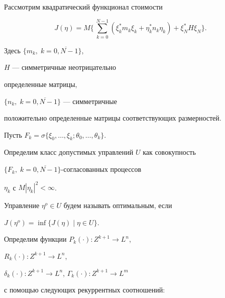 Рассмотрим квадратический функционал стоимости


\begin{equation}


J(\eta)=M\biggl\{\,\sum_{k=0}^{N-1}(\xi_{k}^{*}m_{k}\xi_{k}


+\eta_{k}^{*}n_{k}\eta_{k})+\xi_{N}^{*}H\xi_{N}\biggr\}.


\end{equation}


Здесь $\bigl\{m_{k},\; k=\overline{0,N-1}\bigr\}$, 


$H$ --- симметричные неотрицательно


определенные матрицы,


$\bigl\{n_{k},\; k=\overline{0,N-1}\bigr\}$ --- симметричные


положительно определенные матрицы соответствующих размерностей.





Пусть $F_{k}=\sigma\bigl\{\xi_{0},\dotsc,\xi_{k};\theta_{0},


\dotsc,\theta_{k}\bigr\}$.


Определим класс допустимых управлений $U$ как совокупность


$\bigl\{F_{k},\; k=\overline{0,N-1}\bigr\}$-согласованных процессов


$\eta_{k}$ с $M{|\eta_{k}|}^{2}<\infty$.





Управление $\eta^{o}\in U$ будем называть оптимальным, если


$J(\eta^{o})=\inf\bigl\{J(\eta)\mid\eta\in U\bigl\}$.





Определим функции $P_{k}(\cdot):Z^{k+1}\to L^{n}$,


$R_{k}(\cdot):Z^{k+1}\to L^{n}$,


$\delta_{k}(\cdot):Z^{k+1}\to L^{n}$, $\Gamma_{k}(\cdot):Z^{k+1}\to L^{m}$


с помощью следующих рекуррентных соотношений:


